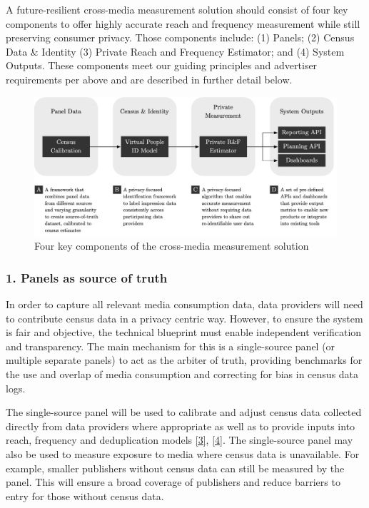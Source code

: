 \documentclass[]{article}
\begin{document}
A future-resilient cross-media measurement solution should consist of four key components to offer highly accurate reach and frequency measurement while still preserving consumer privacy. Those components include: (1) Panels; (2) Census Data \& Identity (3) Private Reach and Frequency Estimator; and (4) System Outputs. These components meet our guiding principles and advertiser requirements per above and are described in further detail below.


\begin{figure}
\caption{Four key components of the cross-media measurement solution}
\vspace*{0.5cm}
\includegraphics[width=\textwidth]{image1.png}
\centering
\end{figure}
\vspace*{0.5cm}

\subsubsection{1. Panels as source of truth}

In order to capture all relevant media consumption data, data providers will need to contribute census data in a privacy centric way. However, to ensure the system is fair and objective, the technical blueprint must
enable independent verification and transparency. The main mechanism for this is a single-source panel (or multiple separate panels) to act as the arbiter of truth, providing benchmarks for the use and overlap of
media consumption and correcting for bias in census data logs.

The single-source panel will be used to calibrate and adjust census data collected directly from data providers where appropriate as well as to provide inputs into reach, frequency and deduplication models \hyperref[ref:3]{[3]}, \hyperref[ref:4]{[4]}. The single-source panel may also be used to measure exposure to media where census data is unavailable. For example, smaller publishers without census data can still be measured by the panel. This will ensure a broad coverage of publishers and reduce barriers to entry for those without census data.
\end{document}
